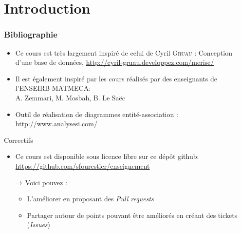 \section{Introduction}

\begin{frame}
  \frametitle{Bibliographie}
  \begin{itemize}
    \item Ce cours est très largement inspiré de celui de Cyril \textsc{Gruau} : Conception d'une base de
      données, \url{http://cyril-gruau.developpez.com/merise/}
    \item Il est également inspiré par les cours réalisés par des enseignants de
      l'ENSEIRB-MATMECA:\\A. Zemmari, M. Mosbah, B. Le Saëc
    \item Outil de réalisation de diagrammes entité-association : \url{http://www.analysesi.com/}
  \end{itemize}
\end{frame}

\begin{framentitle}{Correctifs}
    \begin{itemize}
        \item Ce cours est disponible sous licence libre sur ce dépôt github:\\
            \small{\url{https://github.com/sfourestier/enseignement}}
        \item[$\rightarrow$] Voici pouvez :
            \begin{itemize}
                \item L'améliorer en proposant des \emph{Pull requests}
                \item Partager autour de points pouvant être améliorés en créant des
                    tickets (\emph{Issues})
            \end{itemize}
    \end{itemize}
\end{framentitle}

